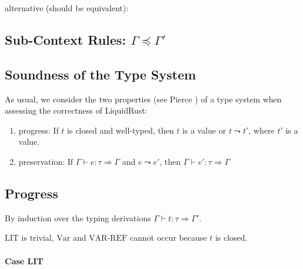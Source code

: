 \documentclass{article}
\newcommand{\mtext}[1]{$\text{#1}$}
\theoremstyle{definition}
\begin{document}
alternative (should be equivalent):

\begin{prooftree}
\end{prooftree}


\subsection{Sub-Context Rules: $\Gamma \preceq \Gamma'$}


\begin{prooftree}
\end{prooftree}

\subsection{Soundness of the Type System}

As usual, we consider the two properties (see Pierce \cite[p. 95]{pierce_types_2002}) of a type system when assessing the correctness of LiquidRust:

\begin{enumerate}
  \item progress: 
    If $t$ is closed and well-typed, then $t$ is a value or $t \leadsto t'$, where $t'$ is a value.
  \item preservation: If $\Gamma \vdash e : \tau \Rightarrow \Gamma$ and $e \leadsto e'$, then $\Gamma \vdash e' : \tau \Rightarrow \Gamma$
\end{enumerate}

\subsection{Progress}

By induction over the typing derivations $\Gamma \vdash t : \tau \Rightarrow \Gamma'$.

\mtext{LIT} is trivial, \mtext{Var} and \mtext{VAR-REF} cannot occur because $t$ is closed.

\paragraph*{Case LIT} 
\end{document}
